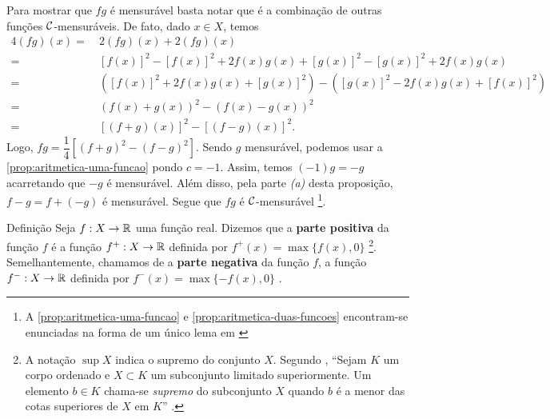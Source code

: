 \begin{prova}
    Para mostrar que $fg$ é mensurável basta notar que é a combinação de outras funções $\operatorname{\mathcal{C}}$-mensuráveis.
    De fato, dado $x \in X$, temos
    	\vspace{-0.2cm}
	    \begin{align*}
	        4(fg)(x) 
	        =& \ 2(fg)(x) +  2(fg)(x)\\
	        =& \ [f(x)]^2 - [f(x)]^2 + 2f(x)g(x) + [g(x)]^2 - [g(x)]^2 + 2f(x)g(x)\\
	        =& \ \left([f(x)]^2 + 2f(x)g(x) + [g(x)]^2\right)  - \left([g(x)]^2 - 2f(x)g(x) + [f(x)]^2\right)\\
	        =& \ (f(x) +g(x))^2 - (f(x) - g(x))^2\\
	        =& \ [(f+g)(x)]^2 - [(f-g)(x)]^2.    
    	\end{align*}
    \vspace{-0.2cm}
    Logo, $fg = \dfrac{1}{4}\left[(f+g)^2 - (f-g)^2\right]$.
    Sendo $g$ mensurável, podemos usar a \ref{prop:aritmetica-uma-funcao} pondo $c= -1$.
    Assim, temos $(-1)g = -g$ acarretando que $-g$ é mensurável.
    Além disso, pela parte \textit{(a)} desta proposição, $f - g = f+ (-g)$ é mensurável.
    Segue que $fg$ é $\operatorname{\mathcal{C}}$-mensurável
    \footnote{A \ref{prop:aritmetica-uma-funcao} e \ref{prop:aritmetica-duas-funcoes} encontram-se enunciadas na forma de um único lema em \cite[p.9]{bartle}}.
\end{prova}
\begin{env}{Definição}
	\label{def:parte-positiva e negativa}
    Seja $f: X \to \mathbb{R}$ uma função real. 
    Dizemos que a \textbf{parte positiva} da função $f$ é a função $f^+: X \to \mathbb{R}$ definida por $f^+(x) = \max\{f(x), 0\}$
    \footnote{A notação $\sup X$ indica o supremo do conjunto $X$. 
    	Segundo \citeauthor{elon}, \enquote{Sejam $K$ um corpo ordenado e $X \subset K$ um subconjunto limitado superiormente. 
    	Um elemento $b \in K$ chama-se \textit{supremo} do
    	subconjunto $X$ quando $b$ é a menor das cotas superiores de $X$ em $K$} \cite[p.75]{elon}.  
	}.
    Semelhantemente, chamamos de a \textbf{parte negativa} da função $f$, a função $f^-: X \to \mathbb{R}$ definida por $f^-(x) = \max\{-f(x), 0\}$ .
\vspace{-0.2cm}\end{env}

